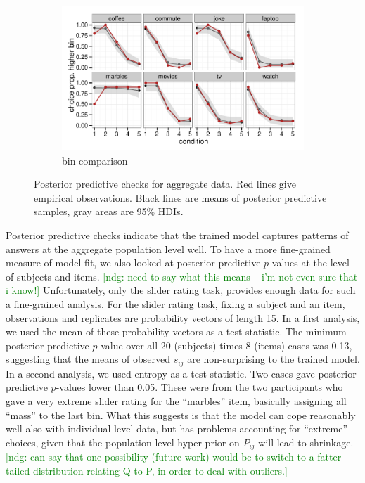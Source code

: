 \documentclass[10pt,letterpaper]{article}
\newcommand{\ndg}[1]{\textcolor{Green}{[ndg: #1]}}
\begin{document}
\begin{figure}
  \begin{subfigure}[b]{0.5\textwidth}
    \includegraphics[width = \textwidth]{plots/ppc_choice.pdf}
    \caption{bin comparison}
    \label{fig:lightingPPC}
  \end{subfigure}

  \caption{Posterior predictive checks for aggregate data. Red lines give empirical
    observations. Black lines are means of posterior predictive samples, gray areas are
    95\% HDIs.}
  \label{fig:PPCs}
\end{figure}

Posterior predictive checks indicate that the trained model captures patterns of answers at the
aggregate population level well. To have a more fine-grained measure of model fit, we also
looked at posterior predictive $p$-values at the level of subjects and items. \ndg{need to say what this means -- i'm not even sure that i know!} Unfortunately,
only the slider rating task, provides enough data for such a fine-grained analysis. For the
slider rating task, fixing a subject and an item, observations and replicates are probability
vectors of length 15. In a first analysis, we used the mean of these probability vectors as a
test statistic. The minimum posterior predictive $p$-value over all 20 (subjects) times 8
(items) cases was 0.13, suggesting that the means of observed $s_{ij}$ are non-surprising to
the trained model. In a second analysis, we used entropy as a test statistic. Two cases gave
posterior predictive $p$-values lower than 0.05. These were from the two participants who gave a
very extreme slider rating for the ``marbles'' item, basically assigning all ``mass'' to the
last bin. What this suggests is that the model can cope reasonably well also with
individual-level data, but has problems accounting for ``extreme'' choices, given that the
population-level hyper-prior on $P_{ij}$ will lead to shrinkage.
\ndg{can say that one possibility (future work) would be to switch to a fatter-tailed distribution relating Q to P, in order to deal with outliers.}
\end{document}
